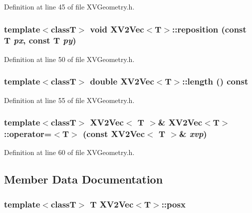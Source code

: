 Definition at line 45 of file XVGeometry.h.\label{XV2Vec_a10}
\hypertarget{class_XV2Vec_a10}{
\subsubsection[reposition]{\setlength{\rightskip}{0pt plus 5cm}template$<$classT$>$ void XV2Vec$<$T$>$::reposition (const T {\em px}, const T {\em py})}}




Definition at line 50 of file XVGeometry.h.\label{XV2Vec_a11}
\hypertarget{class_XV2Vec_a11}{
\subsubsection[length]{\setlength{\rightskip}{0pt plus 5cm}template$<$classT$>$ double XV2Vec$<$T$>$::length () const}}




Definition at line 55 of file XVGeometry.h.\label{XV2Vec_a12}
\hypertarget{class_XV2Vec_a12}{
\subsubsection[operator=]{\setlength{\rightskip}{0pt plus 5cm}template$<$classT$>$ XV2Vec$<$ T $>$\& XV2Vec$<$T$>$::operator=$<$T$>$ (const XV2Vec$<$ T $>$\& {\em xvp})}}




Definition at line 60 of file XVGeometry.h.

\subsection{Member Data Documentation}
\label{XV2Vec_n0}
\hypertarget{class_XV2Vec_n0}{
\subsubsection[posx]{\setlength{\rightskip}{0pt plus 5cm}template$<$classT$>$ T XV2Vec$<$T$>$::posx}}




